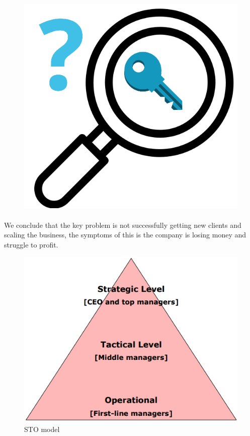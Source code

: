 \begin{figure}
\centering
\includegraphics[scale=0.15]{figures/keyproblem.png}
\end{figure}
\paragraph{}

We conclude that the key problem is not successfully getting new clients and scaling the business, the symptoms of this is the company is losing money and struggle to profit.

\begin{figure}
\centering
\includegraphics[scale=0.3]{figures/strategicallevel.png}
\caption{STO model}
\label{stomodel}
\end{figure}
